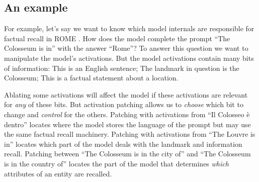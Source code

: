 \documentclass[nonatbib]{article}
\begin{document}
\subsection{An example}
For example, let’s say we want to know which model internals are responsible for factual recall in ROME \citep{ROME}. How does the model complete the prompt “The Colosseum is in” with the answer “Rome”? To answer this question we want to manipulate the model’s activations. But the model activations contain many bits of information: This is an English sentence; The landmark in question is the Colosseum; This is a factual statement about a location.

Ablating some activations will affect the model if these activations are relevant for \textit{any} of these bits. But activation patching allows us to \textit{choose} which bit to change and \textit{control} for the others. Patching with activations from “Il Colosseo è dentro” locates where the model stores the language of the prompt but may use the same factual recall machinery. Patching with activations from “The Louvre is in” locates which part of the model deals with the landmark and information recall. Patching between “The Colosseum is in the city of” and “The Colosseum is in the country of” locates the part of the model that determines \textit{which} attributes of an entity are recalled. 
\end{document}
